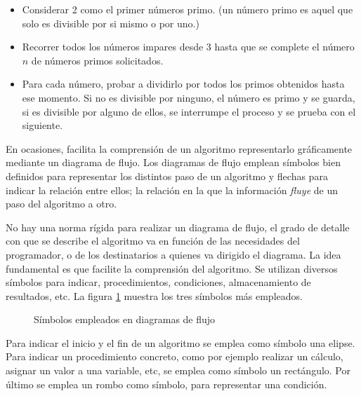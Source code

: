 \begin{itemize}
\item Considerar 2 como el primer números primo. (un número primo es aquel que solo es divisible por si mismo o por uno.)
\item Recorrer todos los números impares desde 3 hasta que se complete el número $n$ de números primos solicitados.
\item Para cada número, probar a dividirlo por todos los primos obtenidos hasta ese momento. Si no es divisible por ninguno, el número es primo y se guarda, si es divisible por alguno de ellos, se interrumpe el proceso y se prueba con el siguiente.
\end{itemize}

En ocasiones, facilita la comprensión de un algoritmo representarlo gráficamente mediante un diagrama de flujo. Los diagramas de flujo emplean símbolos bien definidos para representar los distintos paso de un algoritmo y flechas para indicar la relación entre ellos; la relación en la que la información \emph{fluye} de un paso del algoritmo a otro.

No hay una norma rígida para realizar un diagrama de flujo, el grado de detalle con que se describe el algoritmo va en función de las necesidades del programador, o de los destinatarios a quienes va dirigido el diagrama. La idea fundamental es que facilite la comprensión del algoritmo. Se utilizan diversos símbolos para indicar, procedimientos, condiciones, almacenamiento de resultados, etc. La figura \ref{fig:flujo} muestra los tres símbolos más empleados.

\begin{figure}[h]
\centering
{}
\caption{Símbolos empleados en diagramas de flujo}
\label{fig:flujo}
\end{figure}

Para indicar el inicio y el fin de un algoritmo se emplea como símbolo una elipse. Para indicar un procedimiento concreto, como por ejemplo realizar un cálculo, asignar un valor a una variable, etc, se emplea como símbolo un rectángulo. Por último se emplea un rombo como símbolo, para representar una condición.

